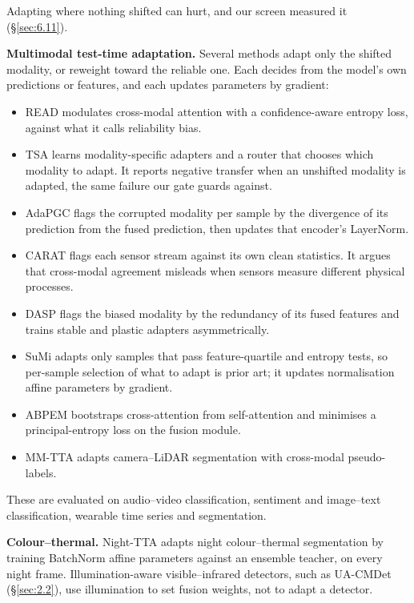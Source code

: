 \documentclass[10pt]{article}
\begin{document}
Adapting where nothing shifted can hurt, and our screen measured it (\S\ref{sec:6.11}).

\textbf{Multimodal test-time adaptation.} Several methods adapt only the shifted modality, or reweight toward the reliable one. Each decides from the model's own predictions or features, and each updates parameters by gradient:
\begin{itemize}
\item READ \citep{yang2024testtime} modulates cross-modal attention with a confidence-aware entropy loss, against what it calls reliability bias.
\item TSA \citep{chen2025testtime} learns modality-specific adapters and a router that chooses which modality to adapt. It reports negative transfer when an unshifted modality is adapted, the same failure our gate guards against.
\item AdaPGC \citep{xu2026multimodal} flags the corrupted modality per sample by the divergence of its prediction from the fused prediction, then updates that encoder's LayerNorm.
\item CARAT \citep{mohapatra2026sourcelearned} flags each sensor stream against its own clean statistics. It argues that cross-modal agreement misleads when sensors measure different physical processes.
\item DASP \citep{he2026decoupling} flags the biased modality by the redundancy of its fused features and trains stable and plastic adapters asymmetrically.
\item SuMi \citep{guo2025smoothing} adapts only samples that pass feature-quartile and entropy tests, so per-sample selection of what to adapt is prior art; it updates normalisation affine parameters by gradient.
\item ABPEM \citep{zhao2025attention} bootstraps cross-attention from self-attention and minimises a principal-entropy loss on the fusion module.
\item MM-TTA \citep{shin2022mmtta} adapts camera--LiDAR segmentation with cross-modal pseudo-labels.
\end{itemize}

These are evaluated on audio--video classification, sentiment and image--text classification, wearable time series and segmentation.

\textbf{Colour--thermal.} Night-TTA \citep{liu2023testtime} adapts night colour--thermal segmentation by training BatchNorm affine parameters against an ensemble teacher, on every night frame. Illumination-aware visible--infrared detectors, such as UA-CMDet (\S\ref{sec:2.2}), use illumination to set fusion weights, not to adapt a detector.
\end{document}
